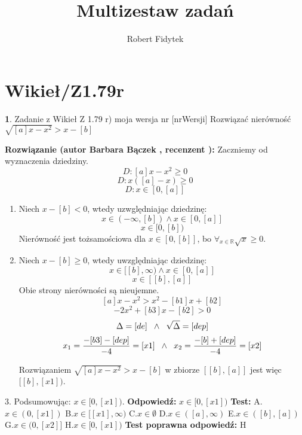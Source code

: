 \documentclass[12pt, a4paper]{article}
\title{Multizestaw zadań}
\author{Robert Fidytek}
\date{}
\theoremstyle{definition} %
\newtheorem{zad}{}
\newcommand{\kategoria}[1]{\section{#1}} %
\newcommand{\zadStart}[1]{\begin{zad}#1\newline} %
\newcommand{\zadStop}{\end{zad}}   %
\newcommand{\rozwStart}[2]{\noindent \textbf{Rozwiązanie (autor #1 , recenzent #2): }\newline} %
\newcommand{\rozwStop}{\newline}                                            %
\newcommand{\odpStart}{\noindent \textbf{Odpowiedź:}\newline}    %
\newcommand{\odpStop}{\newline}                                             %
\newcommand{\testStart}{\noindent \textbf{Test:}\newline} %
\newcommand{\testStop}{\newline} %
\newcommand{\kluczStart}{\noindent \textbf{Test poprawna odpowiedź:}\newline} %
\newcommand{\kluczStop}{\newline} %
\begin{document}
\maketitle


\kategoria{Wikieł/Z1.79r}
\zadStart{Zadanie z Wikieł Z 1.79 r) moja wersja nr [nrWersji]}
Rozwiązać nierówność $\sqrt{[a]x- x^2}>x-[b]$
\zadStop
\rozwStart{Barbara Bączek}{}
Zaczniemy od wyznaczenia dziedziny.
$$D: [a]x- x^2 \geq 0$$
$$D: x([a]-x) \geq 0$$
$$D: x \in [0, [a]]$$
\begin{enumerate}
\item Niech $x -[b] <0$, wtedy uzwględniając dziedzinę:
$$x \in (-\infty,[b]) \wedge x \in [0,[a]]$$
$$x \in [0, [b])$$
Nierówność jest tożsamościowa dla $x \in [0, [b]]$, bo $\displaystyle\mathop{\forall}_{x \in \mathbb{R}} \sqrt{x} \geq 0$.
\item  Niech $x -[b] \geq 0$, wtedy uwzględniając dziedzinę:
$$x \in [[b], \infty) \wedge x \in [0,[a]]$$
$$x \in [[b], [a]]$$
Obie strony nierówności są nieujemne.
$$[a]x - x^2 > x^2 -[b1]x +[b2]$$
$$-2x^2 +[b3]x -[b2]>0$$
$$\Delta = [de] \hspace{0.2 cm} \wedge \hspace{0.2 cm} \sqrt{\Delta}= [dep]$$
$$x_1 = \frac{-[b3]-[dep]}{-4}=[x1]  \hspace{0.2 cm} \wedge \hspace{0.2 cm} x_2 = \frac{-[b]+[dep]}{-4}=[x2]$$

Rozwiązaniem $\sqrt{[a]x- x^2}>x-[b]$ w zbiorze $[[b], [a]]$ jest więc $[[b],[x1])$.
\end{enumerate}
3. Podsumowując: $x \in [0,[x1]).$
\rozwStop
\odpStart
$x \in [0,[x1])$
\odpStop
\testStart
A.$x \in (0,[x1])$
B.$x \in [[x1],\infty)$
C.$x \in \emptyset$
D.$x \in ([a],\infty)$
E.$x \in  ([b],[a])$
G.$x \in (0,[x2]]$
H.$x \in [0,[x1])$
\testStop
\kluczStart
H
\kluczStop
\end{document}
